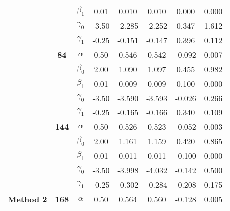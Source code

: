 \begin{table}[h]
\begin{tabular}[t]{>{}c>{}ccccccc}
 &  & $\beta_1$ & 0.01 & 0.010 & 0.010 & 0.000 & 0.000\\

 &  & $\gamma_0$ & -3.50 & -2.285 & -2.252 & 0.347 & 1.612\\

 &  & $\gamma_1$ & -0.25 & -0.151 & -0.147 & 0.396 & 0.112\\

 & \multirow{-5}{*}{\centering\arraybackslash \textbf{84}} & $\alpha$ & 0.50 & 0.546 & 0.542 & -0.092 & 0.007\\

 &  & $\beta_0$ & 2.00 & 1.090 & 1.097 & 0.455 & 0.982\\

 &  & $\beta_1$ & 0.01 & 0.009 & 0.009 & 0.100 & 0.000\\

 &  & $\gamma_0$ & -3.50 & -3.590 & -3.593 & -0.026 & 0.266\\

 &  & $\gamma_1$ & -0.25 & -0.165 & -0.166 & 0.340 & 0.109\\

 & \multirow{-5}{*}{\centering\arraybackslash \textbf{144}} & $\alpha$ & 0.50 & 0.526 & 0.523 & -0.052 & 0.003\\

 &  & $\beta_0$ & 2.00 & 1.161 & 1.159 & 0.420 & 0.865\\

 &  & $\beta_1$ & 0.01 & 0.011 & 0.011 & -0.100 & 0.000\\

 &  & $\gamma_0$ & -3.50 & -3.998 & -4.032 & -0.142 & 0.500\\

 &  & $\gamma_1$ & -0.25 & -0.302 & -0.284 & -0.208 & 0.175\\

\multirow{-15}{*}{\centering\arraybackslash \textbf{Method 2}} & \multirow{-5}{*}{\centering\arraybackslash \textbf{168}} & $\alpha$ & 0.50 & 0.564 & 0.560 & -0.128 & 0.005\\
\bottomrule
\end{tabular}
\end{table}
